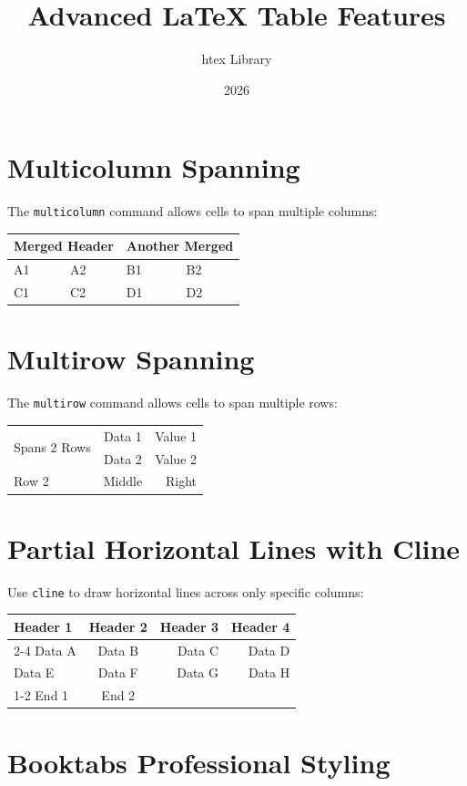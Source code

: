 \documentclass{article}
\title{Advanced LaTeX Table Features}
\author{htex Library}
\date{2026}
\begin{document}
\maketitle

\section{Multicolumn Spanning}

The \texttt{multicolumn} command allows cells to span multiple columns:

\begin{tabular}{|l|l|l|l|}
\hline
\multicolumn{2}{|c|}{\textbf{Merged Header}} & \multicolumn{2}{|c|}{\textbf{Another Merged}} \\
\hline
A1 & A2 & B1 & B2 \\
C1 & C2 & D1 & D2 \\
\hline
\end{tabular}

\section{Multirow Spanning}

The \texttt{multirow} command allows cells to span multiple rows:

\begin{tabular}{|l|c|r|}
\hline
\multirow{2}{*}{Spans 2 Rows} & Data 1 & Value 1 \\
& Data 2 & Value 2 \\
\hline
Row 2 & Middle & Right \\
\hline
\end{tabular}

\section{Partial Horizontal Lines with Cline}

Use \texttt{cline} to draw horizontal lines across only specific columns:

\begin{tabular}{|l|c|r|r|}
\hline
Header 1 & Header 2 & Header 3 & Header 4 \\
\cline{2-4}
Data A & Data B & Data C & Data D \\
Data E & Data F & Data G & Data H \\
\cline{1-2}
End 1 & End 2 & & \\
\hline
\end{tabular}

\section{Booktabs Professional Styling}
\end{document}

